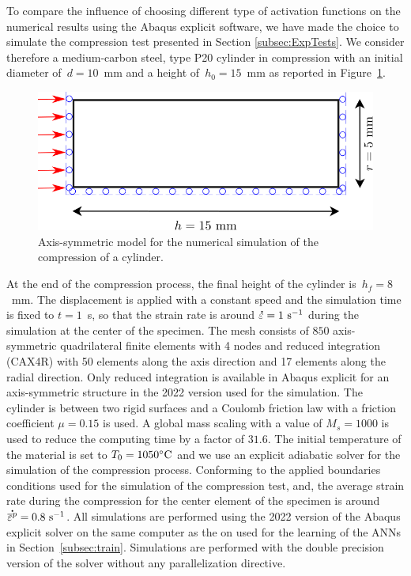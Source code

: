 \documentclass[algorithms,article,submit,pdftex,oneauthors]{Definitions/mdpi}
\DeclareRobustCommand{\mdot}[1]{\accentset{\mbox{\bfseries .}}{#1}}
\DeclareRobustCommand{\ps}{\text{s}^{-1}}
\DeclareRobustCommand{\GPa}{\text{GPa}}
\begin{document}
To compare the influence of choosing different type of activation functions on the numerical results using the Abaqus explicit software, we have made the choice to simulate the compression test presented in Section \ref{subsec:ExpTests}.
We consider therefore a medium-carbon steel, type P20 cylinder in compression with an initial diameter of~$d=10$~mm and a height of~$h_0=15$~mm as reported in Figure~\ref{fig:Num-model}.
\begin{figure}[h]
\centering
\includegraphics[width=0.65\columnwidth]{Figures/CyCompression}
\caption{Axis-symmetric model for the numerical simulation of the compression of a cylinder.}
\label{fig:Num-model}
\end{figure}
At the end of the compression process, the final height of the cylinder is~$h_f=8$~mm. 
The displacement is applied with a constant speed and the simulation time is fixed to $t=1$~s, so that the strain rate is around $\mdot{\varepsilon}=1~\ps$ during the simulation at the center of the specimen.
The mesh consists of $850$ axis-symmetric quadrilateral finite elements with 4 nodes and reduced integration (CAX4R) with 50 elements along the axis direction and 17 elements along the radial direction.
Only reduced integration is available in Abaqus explicit for an axis-symmetric structure in the 2022 version used for the simulation.
The cylinder is between two rigid surfaces and a Coulomb friction law with a friction coefficient $\mu=0.15$ is used.
A global mass scaling with a value of $M_s=1000$ is used to reduce the computing time by a factor of $31.6$.
The initial temperature of the material is set to $T_0=1050\celsius$ and we use an explicit adiabatic solver for the simulation of the compression process. 
Conforming to the applied boundaries conditions used for the simulation of the compression test, and, the average strain rate during the compression for the center element of the specimen is around~$\mdot{\overline{\varepsilon}^p}=0.8~\ps$.
All simulations are performed using the 2022 version of the Abaqus explicit solver on the same computer as the on used for the learning of the ANNs in Section~\ref{subsec:train}. Simulations are performed with the double precision version of the solver without any parallelization directive.
\end{document}
